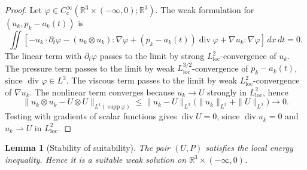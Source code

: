 \documentclass[11pt]{amsart}
\theoremstyle{plain}
\newtheorem{lemma}[theorem]{Lemma}
\theoremstyle{definition}
\theoremstyle{remark}
\numberwithin{equation}{section}
\newcommand{\R}{\mathbb R}
\newcommand{\loc}{\mathrm{loc}}
\newcommand{\supp}{\operatorname{supp}}
\newcommand{\divergence}{\operatorname{div}}
\begin{document}
\begin{proof}
Let \(\varphi\in C_c^\infty(\R^3\times(-\infty,0);\R^3)\).  The weak
formulation for \((u_k,p_k-a_k(t))\) is
\[
   \iint \left[
      -u_k\cdot\partial_t\varphi
      -(u_k\otimes u_k):\nabla\varphi
      +(p_k-a_k(t))\divergence\varphi
      +\nabla u_k:\nabla\varphi
   \right]\,dx\,dt=0.
\]
The linear term with \(\partial_t\varphi\) passes to the limit by strong
\(L^2_{\loc}\)-convergence of \(u_k\).  The pressure term passes to the limit
by weak \(L^{3/2}_{\loc}\)-convergence of \(p_k-a_k(t)\), since
\(\divergence\varphi\in L^3\).  The viscous term passes to the limit by weak
\(L^2_{\loc}\)-convergence of \(\nabla u_k\).  The nonlinear term converges
because \(u_k\to U\) strongly in \(L^2_{\loc}\), hence
\[
   \|u_k\otimes u_k-U\otimes U\|_{L^1(\supp\varphi)}
   \le
   \|u_k-U\|_{L^2}
   \bigl(\|u_k\|_{L^2}+\|U\|_{L^2}\bigr)\to0 .
\]
Testing with gradients of scalar functions gives
\(\divergence U=0\), since \(\divergence u_k=0\) and
\(u_k\rightharpoonup U\) in \(L^2_{\loc}\).
\end{proof}

\begin{lemma}[Stability of suitability]\label{lem:suitability}
The pair \((U,P)\) satisfies the local energy inequality.  Hence it is a
suitable weak solution on \(\R^3\times(-\infty,0)\).
\end{lemma}
\end{document}
